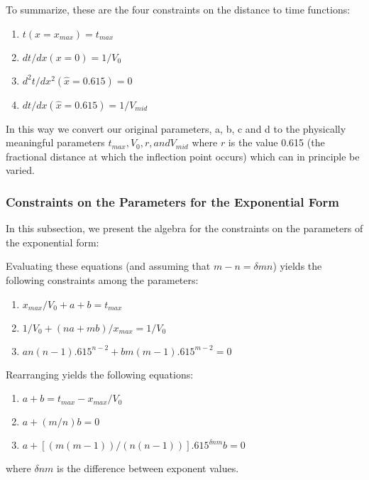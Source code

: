 \documentclass{article}
\begin{document}
To summarize, these are the four constraints on the distance to time functions:
\begin{enumerate}
\item $t(x = x_{max}) = t_{max}$
\item $dt / dx (x = 0) = 1 / V_0$
\item $d^2 t / dx^2 (\hat{x} = 0.615 ) = 0$   
\item $dt / dx (\hat{x} = 0.615 ) = 1/V_{mid}$  
\end{enumerate}

In this way we convert our original parameters, a, b, c and d to the physically meaningful
parameters $t_{max}, V_0, r, and V_{mid}$ where $r$ is the value 0.615 (the fractional distance
at which the inflection point occurs) which can in principle be varied.

\subsubsection{Constraints on the Parameters for the Exponential Form}
In this subsection, we present the algebra for the constraints on the parameters
of the exponential form:

Evaluating these equations (and assuming that $m-n = \delta mn$)
yields the following constraints among the parameters:
\begin{enumerate}
\item $x_{max}/V_0 + a + b = t_{max}$
\item $1/V_0 + (na+mb)/x_{max} = 1/V_0$
\item $a n (n-1) .615^{n-2} + b m (m-1) .615^{m-2} = 0$
\end{enumerate}

Rearranging yields the following equations:
\begin{enumerate}
\item $a + b = t_{max} - x_{max}/V_0$
\item $a + (m/n) b = 0$
\item $a + [(m(m-1))/(n(n-1))] .615^{\delta nm} b = 0$
\end{enumerate}
where $\delta nm$ is the difference between exponent values.
	
\end{document}
